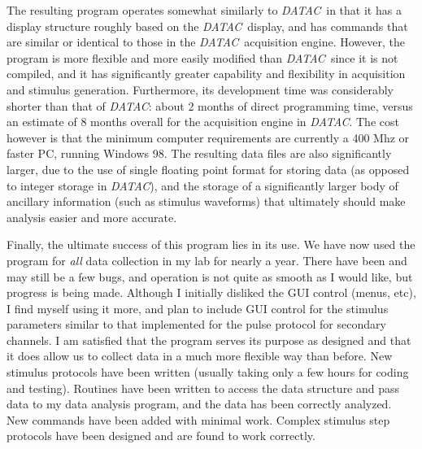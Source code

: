 \documentclass[11pt, letterpaper, titlepage]{paper}
\newcommand{\datac}{\textsl{DATAC}}
\begin{document}
The resulting program operates somewhat similarly to \datac\, in that it has a display 
structure roughly based on the \datac\ display, and has commands that are similar or 
identical to those in the \datac\ acquisition engine. However, the program is more 
flexible and more easily modified than \datac\, since it is not compiled, and it has 
significantly greater capability and flexibility in acquisition and stimulus generation. 
Furthermore, its development time was considerably shorter than that of \datac: about 2 
months of direct programming time, versus an estimate of 8 months overall for the 
acquisition engine in \datac. The cost however is that the minimum computer requirements 
are currently a 400 Mhz or faster PC, running Windows 98. The resulting data files are 
also significantly larger, due to the use of single floating point format for storing 
data (as opposed to integer storage in \datac), and the storage of a significantly larger 
body of ancillary information (such as stimulus waveforms) that ultimately should make 
analysis easier and more accurate.

Finally, the ultimate success of this program lies in its use. We 
have now used the program for \textit{all} data collection in my 
lab for nearly a year. There have been and may still be a few 
bugs, and operation is not quite as smooth as I would like, but 
progress is being made. Although I initially disliked the GUI 
control (menus, etc), I find myself using it more, and plan to 
include GUI control for the stimulus parameters similar to that 
implemented for the pulse protocol for secondary channels. I am 
satisfied that the program serves its purpose as designed and that 
it does allow us to collect data in a much more flexible way than 
before. New stimulus protocols have been written (usually taking 
only a few hours for coding and testing). Routines have been 
written to access the data structure and pass data to my data 
analysis program, and the data has been correctly analyzed. New 
commands have been added with minimal work. Complex stimulus step 
protocols have been designed and are found to work correctly.
\end{document}
